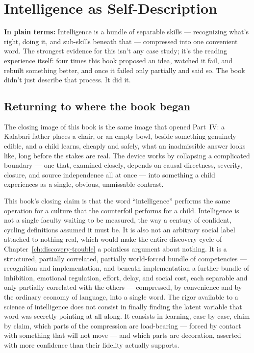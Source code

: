 \chapter{Intelligence as Self-Description}
\label{ch:self-description}

\begin{plainlanguage}
\textbf{In plain terms:} Intelligence is a bundle of separable skills — recognizing what's right, doing it, and sub-skills beneath that — compressed into one convenient word. The strongest evidence for this isn't any case study; it's the reading experience itself: four times this book proposed an idea, watched it fail, and rebuilt something better, and once it failed only partially and said so. The book didn't just describe that process. It did it.
\end{plainlanguage}

\section{Returning to where the book began}

The closing image of this book is the same image that opened Part~IV: a Kalabari father places a chair, or an empty bowl, beside something genuinely edible, and a child learns, cheaply and safely, what an inadmissible answer looks like, long before the stakes are real. The device works by collapsing a complicated boundary --- one that, examined closely, depends on causal directness, severity, closure, and source independence all at once --- into something a child experiences as a single, obvious, unmissable contrast.

This book's closing claim is that the word ``intelligence'' performs the same operation for a culture that the counterfoil performs for a child. Intelligence is not a single faculty waiting to be measured, the way a century of confident, cycling definitions assumed it must be. It is also not an arbitrary social label attached to nothing real, which would make the entire discovery cycle of Chapter~\ref{ch:discovery-trouble} a pointless argument about nothing. It is a structured, partially correlated, partially world-forced bundle of competencies --- recognition and implementation, and beneath implementation a further bundle of inhibition, emotional regulation, effort, delay, and social cost, each separable and only partially correlated with the others --- compressed, by convenience and by the ordinary economy of language, into a single word. The rigor available to a science of intelligence does not consist in finally finding the latent variable that word was secretly pointing at all along. It consists in learning, case by case, claim by claim, which parts of the compression are load-bearing --- forced by contact with something that will not move --- and which parts are decoration, asserted with more confidence than their fidelity actually supports.

